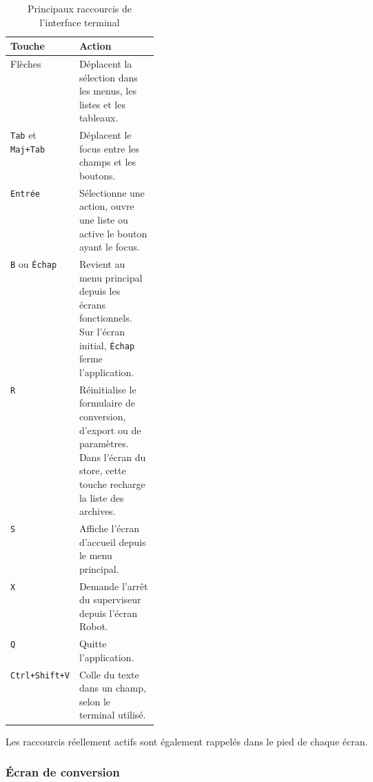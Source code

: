 \documentclass{rapportENSAM}
\begin{document}
\begin{table}[ht]
    \centering
    \begin{tabularx}{\linewidth}{
        |p{0.25\linewidth}
        |X|
    }
        \hline
        \textbf{Touche} &
        \textbf{Action} \\
        \hline

        Flèches &
        Déplacent la sélection dans les menus, les listes et les tableaux. \\
        \hline

        \texttt{Tab} et
        \texttt{Maj+Tab} &
        Déplacent le focus entre les champs et les boutons. \\
        \hline

        \texttt{Entrée} &
        Sélectionne une action, ouvre une liste ou active le bouton ayant le
        focus. \\
        \hline

        \texttt{B} ou
        \texttt{Échap} &
        Revient au menu principal depuis les écrans fonctionnels. Sur l'écran
        initial, \texttt{Échap} ferme l'application. \\
        \hline

        \texttt{R} &
        Réinitialise le formulaire de conversion, d'export ou de paramètres.
        Dans l'écran du store, cette touche recharge la liste des archives. \\
        \hline

        \texttt{S} &
        Affiche l'écran d'accueil depuis le menu principal. \\
        \hline

        \texttt{X} &
        Demande l'arrêt du superviseur depuis l'écran Robot. \\
        \hline

        \texttt{Q} &
        Quitte l'application. \\
        \hline

        \texttt{Ctrl+Shift+V} &
        Colle du texte dans un champ, selon le terminal utilisé. \\
        \hline
    \end{tabularx}
    \caption{Principaux raccourcis de l'interface terminal}
    \label{tab:pc-tui-keyboard}
\end{table}

Les raccourcis réellement actifs sont également rappelés dans le pied de
chaque écran.


\subsubsection{Écran de conversion}
\label{subsubsec:pc-tui-convert-screen}
\end{document}
